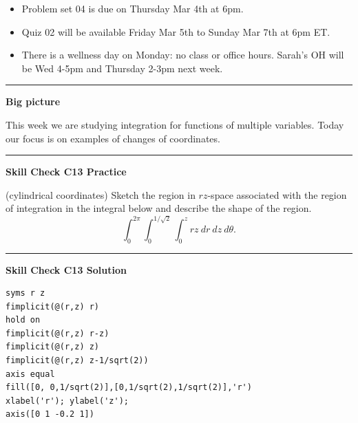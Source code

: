 \documentclass[12pt,letterpaper,noanswers]{exam}
\begin{document}
 \pdfpageheight 11in 
  \pdfpagewidth 8.5in





\begin{itemize}
\itemsep0em
    \item Problem set 04 is due on Thursday Mar 4th at 6pm.
    \item Quiz 02 will be available Friday Mar 5th to Sunday Mar 7th at 6pm ET.
    \item There is a wellness day on Monday: no class or office hours.  Sarah's OH will be Wed 4-5pm and Thursday 2-3pm next week.
\end{itemize}

\hrule
\vspace{0.2cm}


\noindent\textbf{Big picture}

This week we are studying integration for functions of multiple variables.  Today our focus is on examples of changes of coordinates.

\vspace{0.2cm}
\hrule
\vspace{0.2cm}
\noindent\textbf{Skill Check C13 Practice}

\begin{questions}
\item (cylindrical coordinates) Sketch the region in $rz$-space associated with the region of integration in the integral below and describe the shape of the region.
\[\int_0^{2\pi}\int_0^{1/\sqrt{2}}\int_0^z rz\ dr\ dz\ d\theta.\]
\end{questions}

\vspace{0.2cm}
\hrule
\vspace{0.2cm}

\noindent\textbf{Skill Check C13 Solution}


\begin{lstlisting}
syms r z
fimplicit(@(r,z) r)
hold on
fimplicit(@(r,z) r-z)
fimplicit(@(r,z) z)
fimplicit(@(r,z) z-1/sqrt(2))
axis equal
fill([0, 0,1/sqrt(2)],[0,1/sqrt(2),1/sqrt(2)],'r')
xlabel('r'); ylabel('z');
axis([0 1 -0.2 1])
\end{lstlisting}
\end{document}
